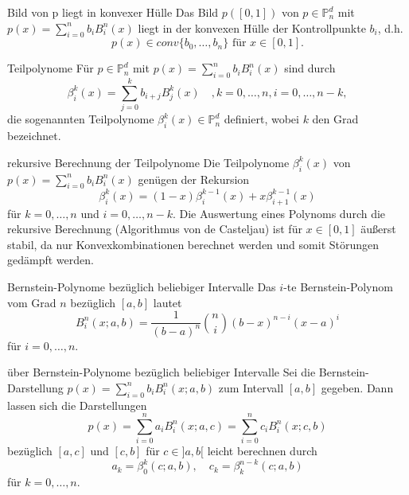 \begin{flashcard}[Satz]{Bild von p liegt in konvexer Hülle}
Das Bild $p([0,1])$ von $p \in \mathbb{P}_n^d$ mit $p(x) = \sum_{i=0}^n b_i B_i^n(x)$
liegt in der konvexen Hülle der Kontrollpunkte $b_i$, d.h.
$$
	p(x) \in conv\lbrace b_0, \ldots , b_n \rbrace \text{ für } x \in [0,1].
$$
\end{flashcard}

\begin{flashcard}[Definition]{Teilpolynome}
Für $p \in \mathbb{P}_n^d$ mit $p(x) = \sum_{i=0}^n b_i B_i^n(x)$ sind durch
$$
	\beta_i^k(x) = \sum_{j=0}^k b_{i+j}B_j^k(x) \quad , k=0, \ldots , n, i=0, \ldots, n-k,
$$
die sogenannten Teilpolynome $\beta_i^k(x) \in \mathbb{P}_n^d$ definiert, wobei $k$ den Grad bezeichnet.
\end{flashcard}

\begin{flashcard}[Satz]{rekursive Berechnung der Teilpolynome}
Die Teilpolynome $\beta_i^k(x)$ von $p(x) = \sum_{i=0}^n b_i B_i^n(x)$ genügen der Rekursion
$$
	\beta_i^k(x) = (1-x)\beta_i^{k-1}(x) + x\beta_{i+1}^{k-1}(x)
$$
für $k=0, \ldots , n$ und $i = 0, \ldots , n-k$. \linebreak
Die Auswertung eines Polynoms durch die rekursive Berechnung (Algorithmus von de Casteljau)
ist für $x \in  [0,1]$ äußerst stabil, da nur Konvexkombinationen berechnet werden und somit Störungen gedämpft werden.
\end{flashcard}

\begin{flashcard}[Definition]{Bernstein-Polynome bezüglich beliebiger Intervalle}
Das $i$-te Bernstein-Polynom vom Grad $n$ bezüglich $[a,b]$ lautet
$$
	B_i^n(x; a, b) = \frac{1}{(b-a)^n}\binom{n}{i}(b-x)^{n-i}(x-a)^i
$$
für $i=0, \ldots , n$.
\end{flashcard}

\begin{flashcard}[Satz]{über Bernstein-Polynome bezüglich beliebiger Intervalle}
Sei die Bernstein-Darstellung $p(x) = \sum_{i=0}^n b_i B_i^n(x; a, b)$ zum Intervall $[a,b]$ gegeben.
Dann lassen sich die Darstellungen
$$
	p(x) = \sum_{i=0}^n a_i B_i^n(x; a, c) = \sum_{i=0}^n c_i B_i^n(x; c, b)
$$
bezüglich $[a, c]$ und $[c, b]$ für $c \in ]a, b[$ leicht berechnen durch
$$
	a_k = \beta_0^k(c; a,b), \quad c_k = \beta_k^{n-k}(c; a, b)
$$
für $k=0, \ldots ,n$.
\end{flashcard}
